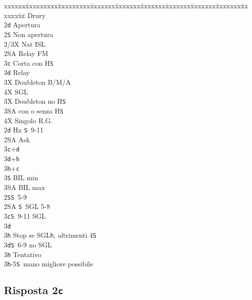 \documentclass[a4paper,italian]{article}
\newcommand{\BS}{\small{\texttt{S}}}
\newcommand{\BC}{\small{\texttt{c}}}
\newcommand{\BD}{\small{\texttt{d}}}
\newcommand{\BH}{\small{\texttt{h}}}
\newcommand{\pdfc}{\texorpdfstring{\texttt{c}}{C}}
\newenvironment{bidtable}
{\begin{tabbing}

    xxxxxx\=xxxxxxxxx\=xxxxxxxxx\=xxxxxxx\=xxxxxxx\=xxxxxxx\=xxxxxxx\=xxxxxxx\=xxxxxxx\=xxxxxxx\=\kill}
{\end{tabbing} }%
\begin{document}
\begin{multicols}{2}
    \begin{bidtable}
        2\BC \> Drury\+\\
        2\BD \> Apertura\\
        2\BS \> Non apertura\\
        2/3X \> Nat ISL\\
        2\small{SA} \> Relay FM\+\\
        3\BC \> Corta con H\BS \+\\
        3\BD \> Relay\+\\
        3X \> Doubleton B/M/A\\
        4X \> SGL\-\-\\
        3X \> Doubleton no H\BS \\
        3\small{SA}  con o senza H\BS \\
        4X \> Singolo R.G.\-\-\\
        2\BD \> Hx \BS\ 9-11\+\\
        2\small{SA} \> Ask \+\\
        3\BC {}+\BD\\
        3\BD {}+\BH\\
        3\BH {}+\BC\\
        3\BS \> BIL min\\
        3\small{SA} \> BIL max\-\-\\
        2\BS {}\BS\ 5-9\\
        2\small{SA} \BS\ SGL 5-8\\
        3\BC {}\BS\ 9-11 SGL\+\\
        3\BD \> \textregistered\\
        3\BH \> Stop se SGL\BH, altrimenti 4\BS\-\\
        3\BD {}\BS\ 6-9 no SGL\+\\
        3\BH \> Tentativo \-\\
        3\BH {}-5\BS\, mano migliore possibile
    \end{bidtable}
\end{multicols}

\newpage

\subsection{Risposta 2\pdfc}
\end{document}
